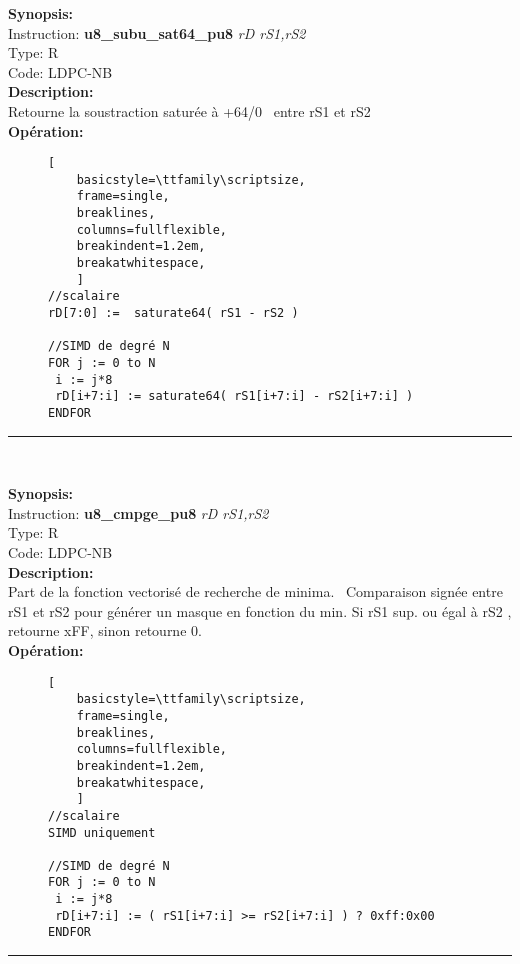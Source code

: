 {\scriptsize
\textbf{Synopsis:}\\
Instruction: \textbf{u8\_subu\_sat64\_pu8 } \textit{rD rS1,rS2}\\
Type: R\\
Code: LDPC-NB\\
\textbf{Description:}\\
Retourne la soustraction saturée à +64/0  entre rS1 et rS2 \\
\textbf{Opération:}\\
    \begin{figure}[H]
    \begin{lstlisting}[
    basicstyle=\ttfamily\scriptsize,
    frame=single,
    breaklines,
    columns=fullflexible,
    breakindent=1.2em,
    breakatwhitespace,
    ]
//scalaire
rD[7:0] :=  saturate64( rS1 - rS2 ) 
    
//SIMD de degré N
FOR j := 0 to N
 i := j*8
 rD[i+7:i] := saturate64( rS1[i+7:i] - rS2[i+7:i] )
ENDFOR
\end{lstlisting}
\end{figure}
}
\rule{8cm}{0.4pt}\\
{\scriptsize
\textbf{Synopsis:}\\
Instruction: \textbf{u8\_cmpge\_pu8 } \textit{rD rS1,rS2}\\
Type: R\\
Code: LDPC-NB\\
\textbf{Description:}\\
Part de la fonction vectorisé de recherche de minima.  Comparaison signée entre rS1 et rS2 pour générer un masque en fonction du min. 
Si rS1 sup. ou égal à rS2 , retourne xFF,  sinon retourne 0. \\
\textbf{Opération:}\\
    \begin{figure}[H]
    \begin{lstlisting}[
    basicstyle=\ttfamily\scriptsize,
    frame=single,
    breaklines,
    columns=fullflexible,
    breakindent=1.2em,
    breakatwhitespace,
    ]
//scalaire
SIMD uniquement 
    
//SIMD de degré N
FOR j := 0 to N
 i := j*8
 rD[i+7:i] := ( rS1[i+7:i] >= rS2[i+7:i] ) ? 0xff:0x00
ENDFOR
\end{lstlisting}
\end{figure}
}
\rule{8cm}{0.4pt}\\
